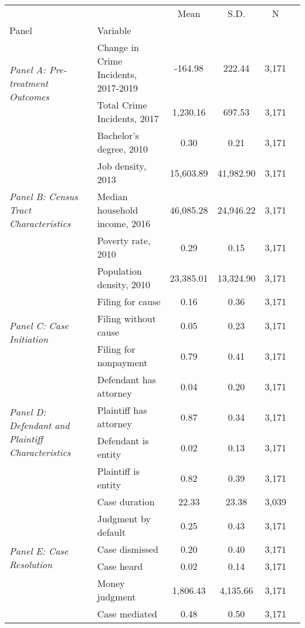 \begin{tabular}{llcccc}
\toprule
 &  & Mean & S.D. & N \\
Panel & Variable &  &  &  \\
\midrule
\multirow[c]{2}{4cm}{\textit{Panel A: Pre-treatment Outcomes}} & Change in Crime Incidents, 2017-2019 & -164.98 & 222.44 & 3,171 \\
 & Total Crime Incidents, 2017 & 1,230.16 & 697.53 & 3,171 \\
\cline{1-5}
\multirow[c]{5}{4cm}{\textit{Panel B: Census Tract Characteristics}} & Bachelor's degree, 2010 & 0.30 & 0.21 & 3,171 \\
 & Job density, 2013 & 15,603.89 & 41,982.90 & 3,171 \\
 & Median household income, 2016 & 46,085.28 & 24,946.22 & 3,171 \\
 & Poverty rate, 2010 & 0.29 & 0.15 & 3,171 \\
 & Population density, 2010 & 23,385.01 & 13,324.90 & 3,171 \\
\cline{1-5}
\multirow[c]{3}{4cm}{\textit{Panel C: Case Initiation}} & Filing for cause & 0.16 & 0.36 & 3,171 \\
 & Filing without cause & 0.05 & 0.23 & 3,171 \\
 & Filing for nonpayment & 0.79 & 0.41 & 3,171 \\
\cline{1-5}
\multirow[c]{4}{4cm}{\textit{Panel D: Defendant and Plaintiff Characteristics}} & Defendant has attorney & 0.04 & 0.20 & 3,171 \\
 & Plaintiff has attorney & 0.87 & 0.34 & 3,171 \\
 & Defendant is entity & 0.02 & 0.13 & 3,171 \\
 & Plaintiff is entity & 0.82 & 0.39 & 3,171 \\
\cline{1-5}
\multirow[c]{6}{4cm}{\textit{Panel E: Case Resolution}} & Case duration & 22.33 & 23.38 & 3,039 \\
 & Judgment by default & 0.25 & 0.43 & 3,171 \\
 & Case dismissed & 0.20 & 0.40 & 3,171 \\
 & Case heard & 0.02 & 0.14 & 3,171 \\
 & Money judgment & 1,806.43 & 4,135.66 & 3,171 \\
 & Case mediated & 0.48 & 0.50 & 3,171 \\
\cline{1-5}
\bottomrule
\end{tabular}
